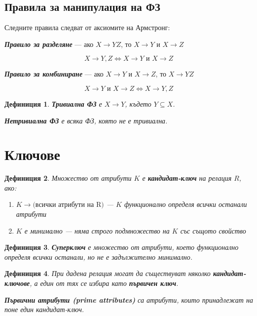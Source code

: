 \documentclass{scrartcl}
\newtheorem{definition}{Дефиниция}
\begin{document}
\begin{FlushLeft}
\subsection{Правила за манипулация на ФЗ}

Следните правила следват от аксиомите на Армстронг:

\textbf{\textit{Правило за разделяне}} --- ако $X \rightarrow YZ$, то $X \rightarrow Y$ и $X \rightarrow Z$

$$X \rightarrow Y, Z \iff X \rightarrow Y \text{ и } X \rightarrow Z$$

\textbf{\textit{Правило за комбиниране}} --- ако $X \rightarrow Y$ и $X \rightarrow Z$, то $X \rightarrow YZ$

$$X \rightarrow Y \text{ и } X \rightarrow Z \iff X \rightarrow Y, Z$$

\begin{definition}
\textbf{\textit{Тривиална ФЗ}} е $X \rightarrow Y$, където $Y \subseteq X$.

\textbf{\textit{Нетривиална ФЗ}} е всяка ФЗ, която не е тривиална.
\end{definition}

\section{Ключове}

\begin{definition}
Множество от атрибути $K$ е \textbf{\textit{кандидат-ключ}} на релация $R$, ако:
\begin{enumerate}
    \item $K \rightarrow \text{(всички атрибути на R)}$ --- $K$ функционално определя всички останали атрибути
    \item $K$ е минимално --- няма строго подмножество на $K$ със същото свойство
\end{enumerate}
\end{definition}

\begin{definition}
\textbf{\textit{Суперключ}} е множество от атрибути, което функционално определя всички останали, но не е задължително минимално.
\end{definition}

\begin{definition}
При дадена релация могат да съществуват няколко \textbf{\textit{кандидат-ключове}}, а един от тях се избира като \textbf{\textit{първичен ключ}}.

\textbf{\textit{Първични атрибути (prime attributes)}} са атрибути, които принадлежат на поне един кандидат-ключ.


\end{definition}
\end{FlushLeft}
\end{document}
